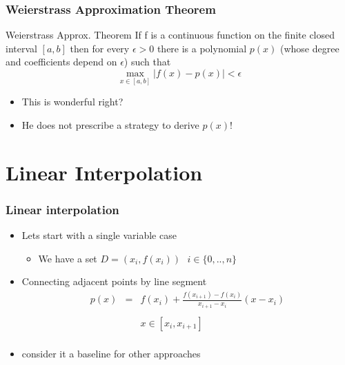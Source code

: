\documentclass[10pt]{beamer}
\begin{document}
\begin{frame}
  \frametitle{Weierstrass Approximation Theorem}
  \begin{block}{Weierstrass Approx. Theorem}
    If f is a continuous function on the finite closed interval
    $[a, b]$ then for every $\epsilon > 0$ there is a polynomial
    $p(x)$ (whose degree and coefficients depend on $\epsilon$) such
    that
    \[
      \max_{x\in[a,b]} | f(x) - p(x) | < \epsilon
    \]
    
  \end{block}
  \begin{itemize}
  \item This is wonderful right?
    \pause
  \item He does not prescribe a strategy to derive $p(x)$!
  \end{itemize}
\end{frame}

\section{Linear Interpolation}


\begin{frame}
  \frametitle{Linear interpolation}
  \begin{itemize}
  \item Lets start with a single variable case
    \begin{itemize}
    \item We have a set $D = (x_i, f(x_i)) \mbox {   } i\in \{ 0, .., n \}$
    \end{itemize}
  \item Connecting adjacent points by line segment
    \[
      \begin{array}{lll}
        p(x) & = &  f(x_i) + \frac{f(x_{i+1}) - f(x_i)}{x_{i+1} - x_i} (x - x_i)\\ & & \\
             &   &  x\in [x_i, x_{i+1}]\\
      \end{array}
    \]
  \item consider it a baseline for other approaches
  \end{itemize}
\end{frame}
\end{document}
